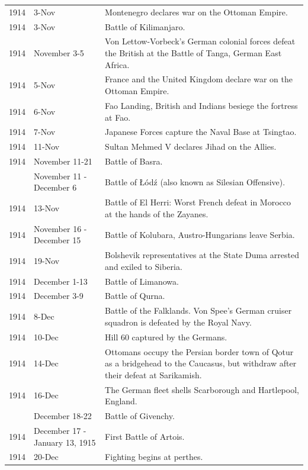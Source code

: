 \documentclass[
  openany]{book}
\begin{document}
\begin{longtable}[t]{rl>{\raggedright\arraybackslash}p{22em}}
1914 & 3-Nov & Montenegro declares war on the Ottoman Empire.\\
\rowcolor{gray!6}  1914 & 3-Nov & Battle of Kilimanjaro.\\
1914 & November 3-5 & Von Lettow-Vorbeck's German colonial forces defeat the British at the Battle of Tanga, German East Africa.\\
\addlinespace
\rowcolor{gray!6}  1914 & 5-Nov & France and the United Kingdom declare war on the Ottoman Empire.\\
1914 & 6-Nov & Fao Landing, British and Indians besiege the fortress at Fao.\\
\rowcolor{gray!6}  1914 & 7-Nov & Japanese Forces capture the Naval Base at Tsingtao.\\
1914 & 11-Nov & Sultan Mehmed V declares Jihad on the Allies.\\
\rowcolor{gray!6}  1914 & November 11-21 & Battle of Basra.\\
\addlinespace
1914 & November 11 - December 6 & Battle of Łódź (also known as Silesian Offensive).\\
\rowcolor{gray!6}  1914 & 13-Nov & Battle of El Herri: Worst French defeat in Morocco at the hands of the Zayanes.\\
1914 & November 16 - December 15 & Battle of Kolubara, Austro-Hungarians leave Serbia.\\
\rowcolor{gray!6}  1914 & 19-Nov & Bolshevik representatives at the State Duma arrested and exiled to Siberia.\\
1914 & December 1-13 & Battle of Limanowa.\\
\addlinespace
\rowcolor{gray!6}  1914 & December 3-9 & Battle of Qurna.\\
1914 & 8-Dec & Battle of the Falklands. Von Spee's German cruiser squadron is defeated by the Royal Navy.\\
\rowcolor{gray!6}  1914 & 10-Dec & Hill 60 captured by the Germans.\\
1914 & 14-Dec & Ottomans occupy the Persian border town of Qotur as a bridgehead to the Caucasus, but withdraw after their defeat at Sarikamish.\\
\rowcolor{gray!6}  1914 & 16-Dec & The German fleet shells Scarborough and Hartlepool, England.\\
\addlinespace
1914 & December 18-22 & Battle of Givenchy.\\
\rowcolor{gray!6}  1914 & December 17 - January 13, 1915 & First Battle of Artois.\\
1914 & 20-Dec & Fighting begins at perthes.\\

\end{longtable}
\end{document}
